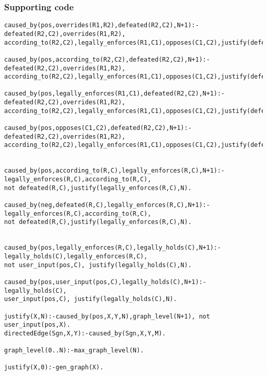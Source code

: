 \subsubsection{Supporting code}
\begin{verbatim}
caused_by(pos,overrides(R1,R2),defeated(R2,C2),N+1):-defeated(R2,C2),overrides(R1,R2),
according_to(R2,C2),legally_enforces(R1,C1),opposes(C1,C2),justify(defeated(R2,C2),N).

caused_by(pos,according_to(R2,C2),defeated(R2,C2),N+1):-defeated(R2,C2),overrides(R1,R2),
according_to(R2,C2),legally_enforces(R1,C1),opposes(C1,C2),justify(defeated(R2,C2),N).

caused_by(pos,legally_enforces(R1,C1),defeated(R2,C2),N+1):-defeated(R2,C2),overrides(R1,R2),
according_to(R2,C2),legally_enforces(R1,C1),opposes(C1,C2),justify(defeated(R2,C2),N).

caused_by(pos,opposes(C1,C2),defeated(R2,C2),N+1):-defeated(R2,C2),overrides(R1,R2),
according_to(R2,C2),legally_enforces(R1,C1),opposes(C1,C2),justify(defeated(R2,C2),N).


caused_by(pos,according_to(R,C),legally_enforces(R,C),N+1):-legally_enforces(R,C),according_to(R,C),
not defeated(R,C),justify(legally_enforces(R,C),N).

caused_by(neg,defeated(R,C),legally_enforces(R,C),N+1):-legally_enforces(R,C),according_to(R,C),
not defeated(R,C),justify(legally_enforces(R,C),N).


caused_by(pos,legally_enforces(R,C),legally_holds(C),N+1):-legally_holds(C),legally_enforces(R,C),
not user_input(pos,C), justify(legally_holds(C),N).

caused_by(pos,user_input(pos,C),legally_holds(C),N+1):-legally_holds(C), 
user_input(pos,C), justify(legally_holds(C),N).

justify(X,N):-caused_by(pos,X,Y,N),graph_level(N+1), not user_input(pos,X).
directedEdge(Sgn,X,Y):-caused_by(Sgn,X,Y,M).

graph_level(0..N):-max_graph_level(N).

justify(X,0):-gen_graph(X). 

\end{verbatim}
